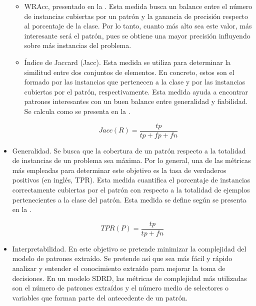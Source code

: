 \documentclass[c5paper,10pt,twoside]{book}	   	%
\begin{document}
\begin{itemize}
	\begin{itemize}
		
		\item   \ac{WRAcc}, presentado en la . Esta medida busca un balance entre el número de instancias cubiertas por un patrón y la ganancia de precisión respecto al porcentaje de la clase. Por lo tanto, cuanto más alto sea este valor, más interesante será el patrón, pues se obtiene una mayor precisión influyendo sobre más instancias del problema.
		
		\item Índice de Jaccard (Jacc). Esta medida se utiliza para determinar la similitud entre dos conjuntos de elementos. En concreto, estos son el formado por las instancias que pertenecen a la clase y por las instancias cubiertas por el patrón, respectivamente. Esta medida ayuda a encontrar patrones interesantes con un buen balance entre generalidad y fiabilidad. Se calcula como se presenta en la  \cite{Tks02}.
		
		\begin{equation} 
		\label{eq:jacc}
		Jacc(R) = \frac{tp}{tp+fp+fn}
		\end{equation}
		
		
		
	\end{itemize}
	
	
	\item Generalidad. Se busca que la cobertura de un patrón respecto a la totalidad de instancias de un problema sea máxima. Por lo general, una de las métricas más empleadas para determinar este objetivo es la tasa de verdaderos positivos (en inglés, \ac{TPR}). Esta medida cuantifica el porcentaje de instancias correctamente cubiertas por el patrón con respecto a la totalidad de ejemplos pertenecientes a la clase del patrón. Esta medida se define según se presenta en la  \cite{Klo96}.
	
	\begin{equation} \label{eq:tpr}
	TPR(P) = \frac{tp}{tp + fn}
	\end{equation}
	
	
	\item Interpretabilidad. En este objetivo se pretende minimizar la complejidad del modelo de patrones extraído. Se pretende así que sea más fácil y rápido analizar y entender el conocimiento extraído para mejorar la toma de decisiones. En un modelo \ac{SDRD}, las métricas de complejidad más utilizadas son el número de patrones extraídos y el número medio de selectores o variables que forman parte del antecedente de un patrón.
	
\end{itemize}
\end{document}
